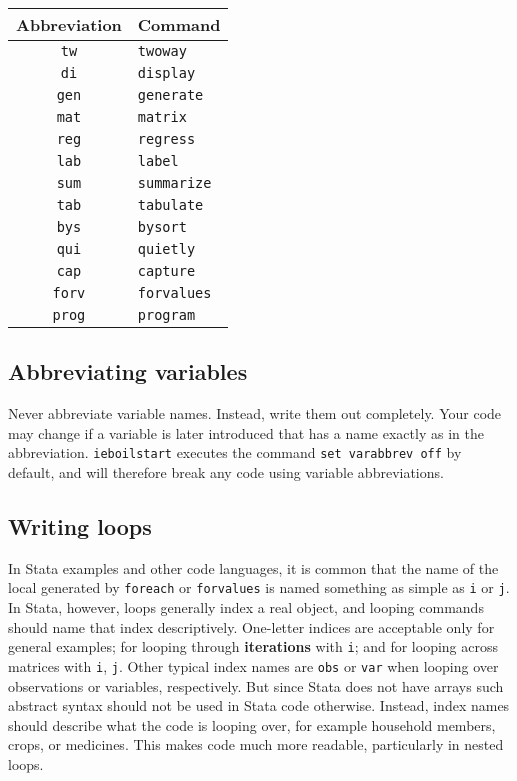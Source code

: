 \begin{center}
	\begin{tabular}{ c | l }
    Abbreviation & Command \\
		\hline
		\texttt{tw} & \texttt{twoway} \\
		\texttt{di} & \texttt{display} \\
		\texttt{gen} & \texttt{generate} \\
		\texttt{mat} & \texttt{matrix} \\
		\texttt{reg} & \texttt{regress} \\
		\texttt{lab} & \texttt{label} \\
		\texttt{sum} & \texttt{summarize} \\
		\texttt{tab} & \texttt{tabulate} \\
		\texttt{bys} & \texttt{bysort} \\
		\texttt{qui} & \texttt{quietly} \\
		\texttt{cap} & \texttt{capture} \\
		\texttt{forv} & \texttt{forvalues} \\
		\texttt{prog} & \texttt{program} \\
		\hline
	\end{tabular}
\end{center}

\subsection{Abbreviating variables}

Never abbreviate variable names. Instead, write them out completely.
Your code may change if a variable is later introduced
that has a name exactly as in the abbreviation.
\texttt{ieboilstart} executes the command \texttt{set varabbrev off} by default,
and will therefore break any code using variable abbreviations.

\subsection{Writing loops}

In Stata examples and other code languages, it is common that the name of the local generated by \texttt{foreach} or \texttt{forvalues}
is named something as simple as \texttt{i} or \texttt{j}. In Stata, however,
loops generally index a real object, and looping commands should name that index descriptively.
One-letter indices are acceptable only for general examples;
for looping through \textbf{iterations} with \texttt{i};
and for looping across matrices with \texttt{i}, \texttt{j}.
Other typical index names are \texttt{obs} or \texttt{var} when looping over observations or variables, respectively.
But since Stata does not have arrays such abstract syntax should not be used in Stata code otherwise.
Instead, index names should describe what the code is looping over, for example household members, crops, or
medicines. This makes code much more readable, particularly in nested loops.

